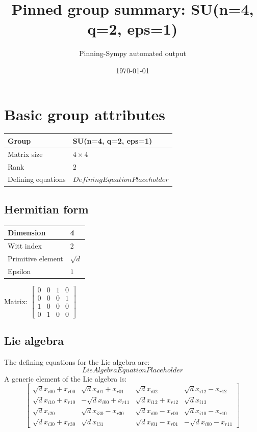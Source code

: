 \documentclass[11pt]{article}
\title{Pinned group summary: SU(n=4, q=2, eps=1)}
\author{Pinning-Sympy automated output}
\date{\today}
\theoremstyle{definition}
\begin{document}
\maketitle
\tableofcontents

\newpage

\section{Basic group attributes}

\begin{tabular}{|l|l|}
	\hline
    Group & SU(n=4, q=2, eps=1) \\
	\hline
    Matrix size & $4 \times 4$ \\
	\hline
    Rank & $2$ \\
	\hline
	Defining equations & $DefiningEquationPlaceholder$ \\
	\hline
\end{tabular}

\subsection{Hermitian form}
\begin{tabular}{|l|l|}
    \hline
    Dimension & 4 \\
    \hline
    Witt index & 2 \\
    \hline
    Primitive element & $\sqrt{d}$ \\
    \hline
    Epsilon & $1$ \\
    \hline
\end{tabular}

\bigskip
\noindent Matrix: \(
\left[\begin{matrix}0 & 0 & 1 & 0\\0 & 0 & 0 & 1\\1 & 0 & 0 & 0\\0 & 1 & 0 & 0\end{matrix}\right]
\)



\subsection{Lie algebra}

The defining equations for the Lie algebra are:
\[
LieAlgebraEquationPlaceholder
\]
A generic element of the Lie algebra is:
\[
\left[\begin{matrix}\sqrt{d} x_{i 0 0} + x_{r 0 0} & \sqrt{d} x_{i 0 1} + x_{r 0 1} & \sqrt{d} x_{i 0 2} & \sqrt{d} x_{i 1 2} - x_{r 1 2}\\\sqrt{d} x_{i 1 0} + x_{r 1 0} & - \sqrt{d} x_{i 0 0} + x_{r 1 1} & \sqrt{d} x_{i 1 2} + x_{r 1 2} & \sqrt{d} x_{i 1 3}\\\sqrt{d} x_{i 2 0} & \sqrt{d} x_{i 3 0} - x_{r 3 0} & \sqrt{d} x_{i 0 0} - x_{r 0 0} & \sqrt{d} x_{i 1 0} - x_{r 1 0}\\\sqrt{d} x_{i 3 0} + x_{r 3 0} & \sqrt{d} x_{i 3 1} & \sqrt{d} x_{i 0 1} - x_{r 0 1} & - \sqrt{d} x_{i 0 0} - x_{r 1 1}\end{matrix}\right]
\]
\end{document}
